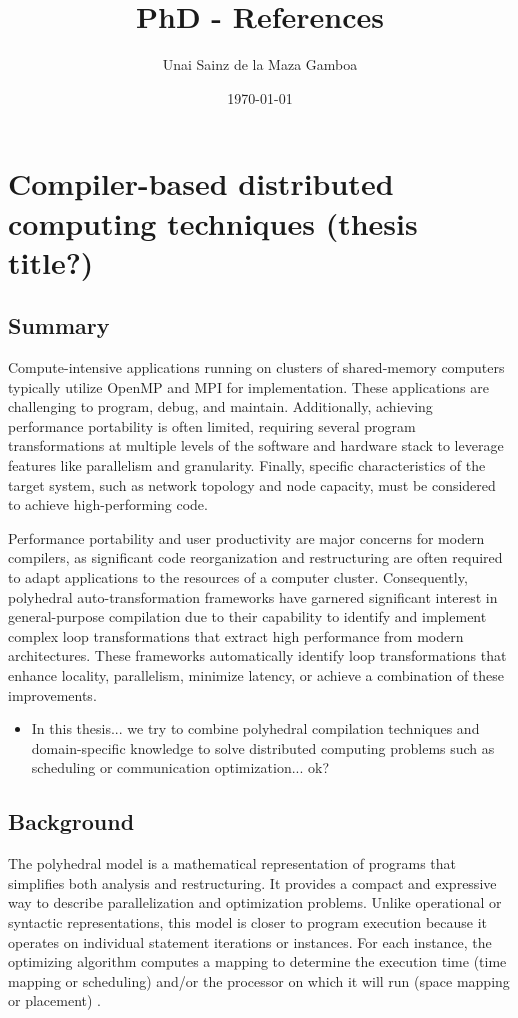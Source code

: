 \documentclass[a4paper, 11pt]{article}
\title{PhD - References}
\author{Unai Sainz de la Maza Gamboa}
\date{\today}
\begin{document}
\maketitle
\tableofcontents
\clearpage

% 
% 
% 

\section{Compiler-based distributed computing techniques (thesis title?)}
\subsection{Summary}
Compute-intensive applications running on clusters of shared-memory computers typically utilize OpenMP and MPI for implementation. These applications are challenging to program, debug, and maintain. Additionally, achieving performance portability is often limited, requiring several program transformations at multiple levels of the software and hardware stack to leverage features like parallelism and granularity. Finally, specific characteristics of the target system, such as network topology and node capacity, must be considered to achieve high-performing code.

Performance portability and user productivity are major concerns for modern compilers, as significant code reorganization and restructuring are often required to adapt applications to the resources of a computer cluster. Consequently, polyhedral auto-transformation frameworks have garnered significant interest in general-purpose compilation due to their capability to identify and implement complex loop transformations that extract high performance from modern architectures. These frameworks automatically identify loop transformations that enhance locality, parallelism, minimize latency, or achieve a combination of these improvements.

\begin{itemize}
    \item In this thesis... we try to combine polyhedral compilation techniques and domain-specific knowledge to solve distributed computing problems such as scheduling or communication optimization... ok?
\end{itemize}

\subsection{Background}
The polyhedral model is a mathematical representation of programs that simplifies both analysis and restructuring. It provides a compact and expressive way to describe parallelization and optimization problems. Unlike operational or syntactic representations, this model is closer to program execution because it operates on individual statement iterations or instances. For each instance, the optimizing algorithm computes a mapping to determine the execution time (time mapping or scheduling) and/or the processor on which it will run (space mapping or placement) \cite{}.
\end{document}
